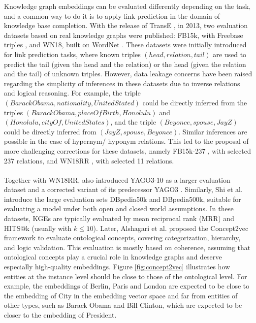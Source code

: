 \documentclass[11pt,titlepage,oneside,openany]{book}
\begin{document}
Knowledge graph embeddings can be evaluated differently depending on the task, and a common way to do it is to apply link prediction in the domain of knowledge base completion. With the release of TransE \cite{bordes_translating_2013}, in 2013, two evaluation datasets based on real knowledge graphs were published: FB15k, with Freebase triples \cite{bollacker_freebase_2008}, and WN18, built on WordNet \cite{soergel_wordnet_1998}. These datasets were initially introduced for link prediction tasks, where known triples $(head, relation, tail)$ are used to predict the tail (given the head and the relation) or the head (given the relation and the tail) of unknown triples. However, data leakage concerns have been raised regarding the simplicity of inferences in these datasets due to inverse relations and logical reasoning. For example, the triple $(BarackObama, nationality, UnitedStated)$ could be directly inferred from the triples $(BarackObama, placeOfBirth, Honolulu)$ and $(Honolulu, cityOf, UnitedStates)$, and the triple $(Beyonce, spouse, JayZ)$ could be directly inferred from $(JayZ, spouse, Beyonce)$. Similar inferences are possible in the case of hypernym/ hyponym relations. This led to the proposal of more challenging corrections for these datasets, namely FB15k-237 \cite{toutanova_observed_2015}, with selected 237 relations, and WN18RR \cite{dettmers_convolutional_2018}, with selected 11 relations.\\
\\
Together with WN18RR, \cite{dettmers_convolutional_2018} also introduced YAGO3-10 as a larger evaluation dataset and a corrected variant of its predecessor YAGO3 \cite{mahdisoltani_yago3_2015}. Similarly, Shi et al. \cite{shi_open-world_2017} introduce the large evaluation sets DBpedia50k and DBpedia500k, suitable for evaluating a model under both open and closed world assumptions. In these datasets, KGEs are typically evaluated by mean reciprocal rank (MRR) and HITS@k (usually with $k \le 10$). Later, Alshagari et al. \cite{alshargi_concept2vec_2020} proposed the Concept2vec framework to evaluate ontological concepts, covering categorization, hierarchy, and logic validation. This evaluation is mostly based on coherence, assuming that ontological concepts play a crucial role in knowledge graphs and deserve especially high-quality embeddings. Figure \ref{fig:concept2vec} illustrates how entities at the instance level should be close to those of the ontological level. For example, the embeddings of Berlin, Paris and London are expected to be close to the embedding of City in the embedding vector space and far from entities of other types, such as Barack Obama and Bill Clinton, which are expected to be closer to the embedding of President.\\
\end{document}
